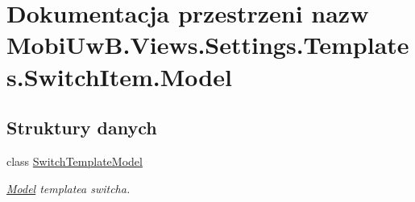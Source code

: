 \hypertarget{a00288}{}\section{Dokumentacja przestrzeni nazw Mobi\+Uw\+B.\+Views.\+Settings.\+Templates.\+Switch\+Item.\+Model}
\label{a00288}
\subsection*{Struktury danych}
\begin{DoxyCompactItemize}
\item 
class \hyperlink{a00065}{Switch\+Template\+Model}
\begin{DoxyCompactList}\small\item\em \hyperlink{a00288}{Model} templatea switcha. \end{DoxyCompactList}\end{DoxyCompactItemize}
